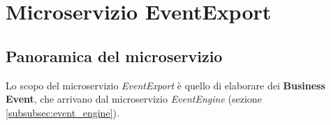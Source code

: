 \chapter{Microservizio EventExport}
\label{cap:MicroservizioEventExport}

\section{Panoramica del microservizio}
\label{sec:ScopoDelMicroservizio}
Lo scopo del microservizio \textit{EventExport} è quello di elaborare dei \textbf{Business Event}, che arrivano dal microservizio \textit{EventEngine} 
(sezione \ref{subsubsec:event_engine}).
